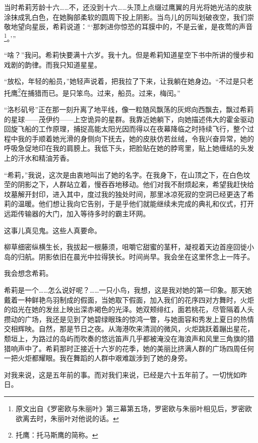 \documentclass[AutoFakeBold=true]{book}
\begin{document}
当时希莉芳龄十六……不，还没到十六……头顶上点缀过鹰翼的月光将她光洁的皮肤涂抹成乳白色，在她胸部柔软的圆周下投上阴影。当鸟儿的厉叫划破夜空，我们崇敬地望向星辰，希莉说道：```那刺进你惊恐的耳膜中的，不是云雀，是夜莺的声音\footnote{原文出自《罗密欧与朱丽叶》第三幕第五场，罗密欧与朱丽叶相见后，罗密欧欲离去时，朱丽叶对他说的话。}。'''

``啥？''我问。希莉快要满十六岁。我十九。但是希莉知道星空下书中所讲的慢步和戏剧的韵律。而我只知道星星。

``放松，年轻的船员，''她轻声说着，把我拉了下来，让我躺在她身边。``不过是只老托鹰\footnote{托鹰：托马斯鹰的简称。}在捕猎而已。是只笨鸟。过来，船员。过来，梅闰。''

``洛杉矶号''正在那一刻升离了地平线，像一粒随风飘荡的灰烬向西飘去，飘过希莉的星球——茂伊约——上空诡异的星群。我靠近她躺下，向她描述伟大的霍金驱动回旋飞船的工作原理，捕捉高能太阳光因而得以在夜幕降临之时持续飞行，整个过程中我的手顺着她光滑的身侧向下抚去，她的皮肤仿若丝绒，令我兴奋异常，她的呼吸急促地印在我的肩膀上。我低下头，把脸贴在她的脖弯里，贴上她缠结的头发上的汗水和精油芳香。

``希莉，''我说，这次是由衷地叫出了她的名字。在我身下，在山顶之下，在白色坟茔的阴影之下，人群站立着，慢吞吞地移动。他们对我不耐烦起来，希望我赶快给坟墓解开封印，进入其中，度过我的独处时间，那里冰凉死寂的空洞已经更迭了希莉的温暖。他们想让我向它告别，于是乎他们就能继续未完成的典礼和仪式，打开远距传输器的大门，加入等待多时的霸主环网。

这事儿真见鬼。这些人真要命。

柳草细密纵横生长，我拔起一根藤须，咀嚼它甜蜜的茎秆，凝视着天边首座回徙小岛的归航。阴影依旧在晨光中拉得狭长。时间尚早。我会坐在这里怀念上一阵子。

我会想念希莉。

\vspace*{1em}

希莉是一个……怎么说好呢？……一只小鸟，我想，这是我对她的第一印象。那天她戴着一种鲜艳鸟羽制成的假面，当她取下假面，加入我们的花序四对方舞时，火炬的焰光在她的发丝上映出深赤褐色的光泽。她双颊绯红，面若桃花，尽管隔着人头攒动的广场，我还是见到了她碧绿眼珠的惊鸿一瞥，与她面容和秀发上夏日的热情交相辉映。自然，那是节日之夜。从海港吹来清润的微风，火炬跳跃着蹦出星花，颓垣上，为路过的岛屿而吹奏的悠远笛声几乎都被淹没在海浪声和风里三角旗的猎猎响声中了。希莉那时正接近十六岁的花季，她的美丽比挤满人群的广场四周任何一把火炬都耀眼。我在舞蹈的人群中艰难跋涉到了她的身旁。

对我来说，这是五年前的事。而对我们来说，已经是六十五年前了。一切恍如昨日。
\end{document}
